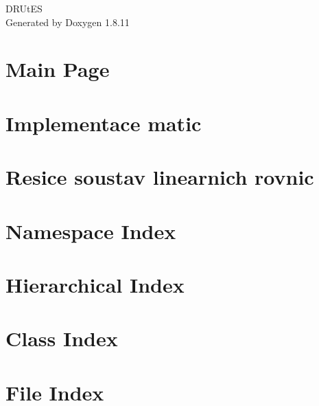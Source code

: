 \documentclass[twoside]{book}
\newcommand{\+}{\discretionary{\mbox{\scriptsize$\hookleftarrow$}}{}{}}
\newcommand{\clearemptydoublepage}{%
  \newpage{\pagestyle{empty}\cleardoublepage}%
}
\begin{document}
\begin{titlepage}
\vspace*{7cm}
\begin{center}%
{\Large D\+R\+Ut\+ES }\\
\vspace*{1cm}
{\large Generated by Doxygen 1.8.11}\\
\end{center}
\end{titlepage}
\clearemptydoublepage
\tableofcontents
\clearemptydoublepage
{}

\chapter{Main Page}
\label{index}
\chapter{Implementace matic}
\label{implem}

\chapter{Resice soustav linearnich rovnic}
\label{resice}

\chapter{Namespace Index}

\chapter{Hierarchical Index}

\chapter{Class Index}

\chapter{File Index}

\end{document}
